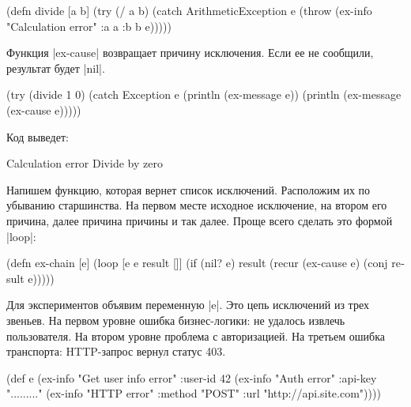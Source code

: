 \label{re-throw-example}

\begin{english}
  \begin{clojure}
(defn divide [a b]
  (try
    (/ a b)
    (catch ArithmeticException e
      (throw (ex-info
              "Calculation error"
              {:a a :b b}
              e)))))
  \end{clojure}
\end{english}

Функция \spverb|ex-cause| возвращает причину исключения. Если ее не сообщили,
результат будет \spverb|nil|.

\begin{english}
  \begin{clojure}
(try
  (divide 1 0)
  (catch Exception e
    (println (ex-message e))
    (println (ex-message (ex-cause e)))))
  \end{clojure}
\end{english}

\noindent
Код выведет:

\begin{english}
  \begin{text}
Calculation error
Divide by zero
  \end{text}
\end{english}

Напишем функцию, которая вернет список исключений. Расположим их по убыванию
старшинства. На первом месте исходное исключение, на втором его причина, далее
причина причины и так далее. Проще всего сделать это формой \spverb|loop|:

\begin{english}
  \begin{clojure}
(defn ex-chain [e]
  (loop [e e
         result []]
    (if (nil? e)
      result
      (recur (ex-cause e) (conj result e)))))
  \end{clojure}
\end{english}

Для экспериментов объявим переменную \spverb|e|. Это цепь исключений из трех
звеньев. На первом уровне ошибка бизнес-логики: не удалось извлечь
пользователя. На втором уровне проблема с авторизацией. На третьем ошибка
транспорта: HTTP-запрос вернул статус 403.

\begin{english}
  \begin{clojure}
(def e
  (ex-info
   "Get user info error"
   {:user-id 42}
   (ex-info "Auth error"
            {:api-key "........."}
            (ex-info "HTTP error"
                     {:method "POST"
                      :url "http://api.site.com"}))))
  \end{clojure}
\end{english}

